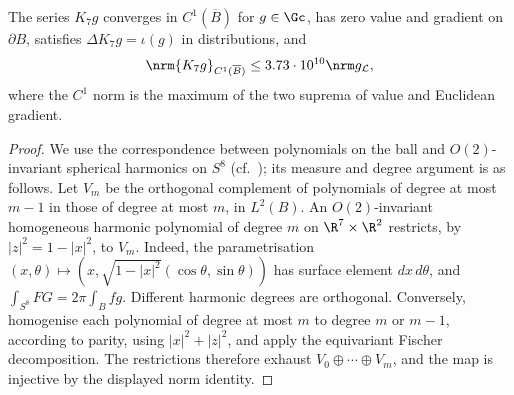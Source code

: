 \begin{proposition}[$C^1$ reconstruction]\label{r7:prop-C1}
The series $K_7g$ converges in $C^1(\overline B)$ for $g\in\Gc$, has zero value and gradient on $\partial B$, satisfies $\Delta K_7g=\iota(g)$ in distributions, and
\[
\nrm{K_7g}_{C^1(\overline B)}\leq3.73\cdot10^{10}\nrm g_{\mathcal L},
\]
where the $C^1$ norm is the maximum of the two suprema of value and Euclidean gradient.
\end{proposition}
\begin{proof}
We use the correspondence between polynomials on the ball and $O(2)$-invariant spherical harmonics on $S^8$ (cf.\ \cite[Ch.~4]{DX14}); its measure and degree argument is as follows. Let $V_m$ be the orthogonal complement of polynomials of degree at most $m-1$ in those of degree at most $m$, in $L^2(B)$. An $O(2)$-invariant homogeneous harmonic polynomial of degree $m$ on $\R^7\times\R^2$ restricts, by $|z|^2=1-|x|^2$, to $V_m$. Indeed, the parametrisation $(x,\theta)\mapsto(x,\sqrt{1-|x|^2}(\cos\theta,\sin\theta))$ has surface element $dx\,d\theta$, and
$\int_{S^8}FG=2\pi\int_Bfg$. Different harmonic degrees are orthogonal. Conversely, homogenise each polynomial of degree at most $m$ to degree $m$ or $m-1$, according to parity, using $|x|^2+|z|^2$, and apply the equivariant Fischer decomposition. The restrictions therefore exhaust $V_0\oplus\cdots\oplus V_m$, and the map is injective by the displayed norm identity.


\end{proof}
